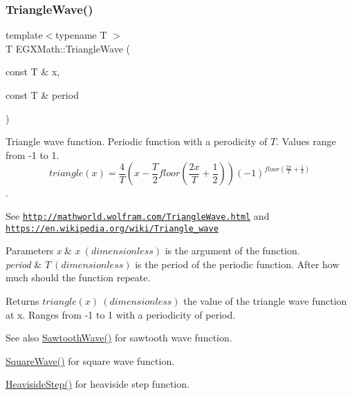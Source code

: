 \subsubsection{\texorpdfstring{Triangle\+Wave()}{TriangleWave()}}
{\footnotesize\ttfamily template$<$typename T $>$ \\
T E\+G\+X\+Math\+::\+Triangle\+Wave (\begin{DoxyParamCaption}\item[{const T \&}]{x,  }\item[{const T \&}]{period }\end{DoxyParamCaption})}



Triangle wave function. Periodic function with a perodicity of $T$. Values range from -\/1 to 1. \[triangle(x)= \frac{4}{T}(x-\frac{T}{2} floor(\frac{2 x}{T}+\frac{1}{2}) )(-1)^{floor(\frac{2 x}{T}+\frac{1}{2})} \]. 

See \href{http://mathworld.wolfram.com/TriangleWave.html}{\tt http\+://mathworld.\+wolfram.\+com/\+Triangle\+Wave.\+html} and \href{https://en.wikipedia.org/wiki/Triangle_wave}{\tt https\+://en.\+wikipedia.\+org/wiki/\+Triangle\+\_\+wave} 
\begin{DoxyParams}{Parameters}
{\em x} & $x\ (dimensionless)$ is the argument of the function. \\
\hline
{\em period} & $T\ (dimensionless)$ is the period of the periodic function. After how much should the function repeate. \\
\hline
\end{DoxyParams}
\begin{DoxyReturn}{Returns}
$triangle(x)\ (dimensionless)$ the value of the triangle wave function at x. Ranges from -\/1 to 1 with a periodicity of period. 
\end{DoxyReturn}
\begin{DoxySeeAlso}{See also}
\mbox{\hyperlink{group___e_g_x_math-_functions-_periodic_ga3eab4a0455f64881f9c183987682d85c}{Sawtooth\+Wave()}} for sawtooth wave function. 

\mbox{\hyperlink{group___e_g_x_math-_functions-_periodic_ga3bdc6c02d347f48f91bca886448db33a}{Square\+Wave()}} for square wave function. 

\mbox{\hyperlink{group___e_g_x_math-_functions-_periodic_ga0fb325d5423606e9c222e1ebd6a65833}{Heaviside\+Step()}} for heaviside step function. 
\end{DoxySeeAlso}
